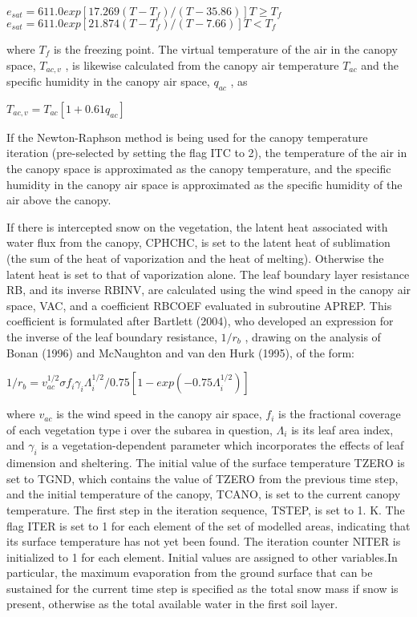 $e_{sat} = 611.0 exp[17.269(T - T_f )/(T - 35.86)] T \geq T_f$ $e_{sat} = 611.0 exp[21.874(T - T_f )/(T - 7.66)] T < T_f$

where $T_f$ is the freezing point. The virtual temperature of the air in the canopy space, $T_{ac,v}$ , is likewise calculated from the canopy air temperature $T_{ac}$ and the specific humidity in the canopy air space, $q_{ac}$ , as

$T_{ac,v} = T_{ac} [1 + 0.61 q_{ac} ]$

If the Newton-\/\+Raphson method is being used for the canopy temperature iteration (pre-\/selected by setting the flag I\+T\+C to 2), the temperature of the air in the canopy space is approximated as the canopy temperature, and the specific humidity in the canopy air space is approximated as the specific humidity of the air above the canopy.

If there is intercepted snow on the vegetation, the latent heat associated with water flux from the canopy, C\+P\+H\+C\+H\+C, is set to the latent heat of sublimation (the sum of the heat of vaporization and the heat of melting). Otherwise the latent heat is set to that of vaporization alone. The leaf boundary layer resistance R\+B, and its inverse R\+B\+I\+N\+V, are calculated using the wind speed in the canopy air space, V\+A\+C, and a coefficient R\+B\+C\+O\+E\+F evaluated in subroutine A\+P\+R\+E\+P. This coefficient is formulated after Bartlett (2004), who developed an expression for the inverse of the leaf boundary resistance, $1/r_b$ , drawing on the analysis of Bonan (1996) \cite{Bonan1996-as} and Mc\+Naughton and van den Hurk (1995), of the form\+:

$1/r_b = v_{ac}^{1/2} \sigma f_i \gamma_i \Lambda_i^{1/2} /0.75 [1 - exp(-0.75 \Lambda_i^{1/2})]$

where $v_{ac}$ is the wind speed in the canopy air space, $f_i$ is the fractional coverage of each vegetation type i over the subarea in question, $\Lambda_i$ is its leaf area index, and $\gamma_i$ is a vegetation-\/dependent parameter which incorporates the effects of leaf dimension and sheltering. The initial value of the surface temperature T\+Z\+E\+R\+O is set to T\+G\+N\+D, which contains the value of T\+Z\+E\+R\+O from the previous time step, and the initial temperature of the canopy, T\+C\+A\+N\+O, is set to the current canopy temperature. The first step in the iteration sequence, T\+S\+T\+E\+P, is set to 1. K. The flag I\+T\+E\+R is set to 1 for each element of the set of modelled areas, indicating that its surface temperature has not yet been found. The iteration counter N\+I\+T\+E\+R is initialized to 1 for each element. Initial values are assigned to other variables.\+In particular, the maximum evaporation from the ground surface that can be sustained for the current time step is specified as the total snow mass if snow is present, otherwise as the total available water in the first soil layer.

